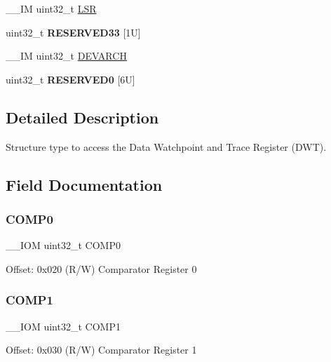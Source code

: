 \begin{DoxyCompactItemize}
\item 
\+\_\+\+\_\+\+IM uint32\+\_\+t \mbox{\hyperlink{struct_d_w_t___type_a7219432d03f6cd1d220f4fe10aef4880}{L\+SR}}
\item 
\mbox{\label{struct_d_w_t___type_acd88b2bd1b17624cc31c9c66496c087d}} 
uint32\+\_\+t {\bfseries R\+E\+S\+E\+R\+V\+E\+D33} \mbox{[}1\+U\mbox{]}
\item 
\+\_\+\+\_\+\+IM uint32\+\_\+t \mbox{\hyperlink{struct_d_w_t___type_ae370aa5dc47fe03310e1d847333030e7}{D\+E\+V\+A\+R\+CH}}
\item 
\mbox{\label{struct_d_w_t___type_a03e332741f84b08486701efc42b0d1da}} 
uint32\+\_\+t {\bfseries R\+E\+S\+E\+R\+V\+E\+D0} \mbox{[}6\+U\mbox{]}
\end{DoxyCompactItemize}


\subsection{Detailed Description}
Structure type to access the Data Watchpoint and Trace Register (D\+WT). 

\subsection{Field Documentation}
\mbox{\label{struct_d_w_t___type_a5d0c69187f8abc99ecbde49431cf0050}} 
\subsubsection{\texorpdfstring{COMP0}{COMP0}}
{\footnotesize\ttfamily \+\_\+\+\_\+\+I\+OM uint32\+\_\+t C\+O\+M\+P0}

Offset\+: 0x020 (R/W) Comparator Register 0 \mbox{\label{struct_d_w_t___type_af9126caaf63b99d6df5d1e040c96e2ab}} 
\subsubsection{\texorpdfstring{COMP1}{COMP1}}
{\footnotesize\ttfamily \+\_\+\+\_\+\+I\+OM uint32\+\_\+t C\+O\+M\+P1}

Offset\+: 0x030 (R/W) Comparator Register 1 \mbox{\label{struct_d_w_t___type_a8d5685c2bd0db66c3adaf19bc10a1150}} 
